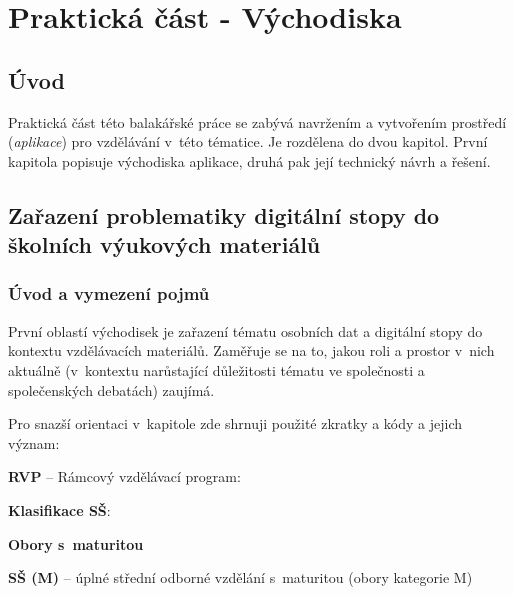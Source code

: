 \chapter{Praktická část - Východiska}

\section*{Úvod}
Praktická část této balakářské práce se zabývá navržením a vytvořením prostředí (\textit{aplikace}) pro vzdělávání v~této tématice.
Je rozdělena do dvou kapitol. První kapitola popisuje východiska aplikace, druhá pak její technický návrh a řešení.

\section{Zařazení problematiky digitální stopy do školních výukových materiálů}

\subsection*{Úvod a vymezení pojmů}

První oblastí východisek je zařazení tématu osobních dat a digitální stopy do kontextu vzdělávacích materiálů.
Zaměřuje se na to, jakou roli a prostor v~nich aktuálně (v~kontextu narůstající důležitosti tématu ve společnosti a společenských debatách) zaujímá.

Pro snazší orientaci v~kapitole zde shrnuji použité zkratky a kódy a jejich význam:

\textbf{RVP} -- Rámcový vzdělávací program:

\begin{displayquote}
 \citep{rvp} 
\end{displayquote}

\textbf{Klasifikace SŠ}:

\textbf{Obory s~maturitou}

\textbf{SŠ (M)} -- úplné střední odborné vzdělání s~maturitou (obory kategorie M)

\begin{displayquote}
 \citep{stredni-vzdelavani}
\end{displayquote}

